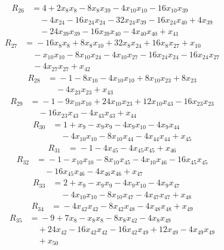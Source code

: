 \begin{align*}
R_{26}&={}4 +2x_{8}x_{8} -8x_{8}x_{39} -4x_{10}x_{10} -16x_{10}x_{39}\\
&\quad{}-4x_{24} -16x_{24}x_{24} -32x_{24}x_{39} -16x_{24}x_{40} +4x_{39}\\
&\quad{}-24x_{39}x_{39} -16x_{39}x_{40} -4x_{40}x_{40} +x_{41}
\end{align*}
\begin{align*}
R_{27}&={}-16x_{8}x_{8} +8x_{8}x_{10} +32x_{8}x_{24} +16x_{8}x_{27} +x_{10}\\
&\quad{}-x_{10}x_{10} -8x_{10}x_{24} -4x_{10}x_{27} -16x_{24}x_{24} -16x_{24}x_{27}\\
&\quad{}-4x_{27}x_{27} +x_{42}
\end{align*}
\begin{align*}
R_{28}&={}-1 -8x_{10} -4x_{10}x_{10} +8x_{10}x_{23} +8x_{23}\\
&\quad{}-4x_{23}x_{23} +x_{43}
\end{align*}
\begin{align*}
R_{29}&={}-1 -9x_{10}x_{10} +24x_{10}x_{23} +12x_{10}x_{43} -16x_{23}x_{23}\\
&\quad{}-16x_{23}x_{43} -4x_{43}x_{43} +x_{44}
\end{align*}
\begin{align*}
R_{30}&={}1 +x_{9} -x_{9}x_{9} -4x_{9}x_{10} -4x_{9}x_{44}\\
&\quad{}-4x_{10}x_{10} -8x_{10}x_{44} -4x_{44}x_{44} +x_{45}
\end{align*}
\begin{align*}
R_{31}&={}-1 -4x_{45} -4x_{45}x_{45} +x_{46}
\end{align*}
\begin{align*}
R_{32}&={}-1 -x_{10}x_{10} -8x_{10}x_{45} -4x_{10}x_{46} -16x_{45}x_{45}\\
&\quad{}-16x_{45}x_{46} -4x_{46}x_{46} +x_{47}
\end{align*}
\begin{align*}
R_{33}&={}2 +x_{9} -x_{9}x_{9} -4x_{9}x_{10} -4x_{9}x_{47}\\
&\quad{}-4x_{10}x_{10} -8x_{10}x_{47} -4x_{47}x_{47} +x_{48}
\end{align*}
\begin{align*}
R_{34}&={}-4x_{42}x_{42} -8x_{42}x_{48} -4x_{48}x_{48} +x_{49}
\end{align*}
\begin{align*}
R_{35}&={}-9 +7x_{8} -x_{8}x_{8} -8x_{8}x_{42} -4x_{8}x_{49}\\
&\quad{}+24x_{42} -16x_{42}x_{42} -16x_{42}x_{49} +12x_{49} -4x_{49}x_{49}\\
&\quad{}+x_{50}
\end{align*}
